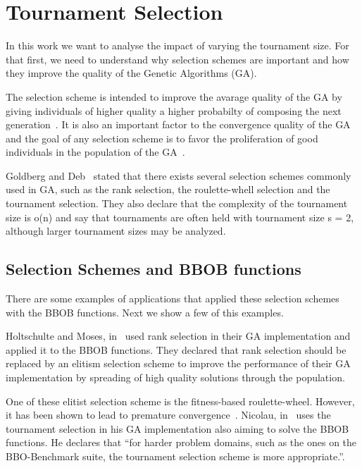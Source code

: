 \section{Tournament Selection}\label{sec:background:Selection Scheme} 

In this work we want to analyse the impact of varying the tournament size. For that first, we need to understand why selection schemes are important and how they improve the quality of the Genetic Algorithms (GA).

The selection scheme is intended to improve the avarage quality of the GA by giving individuals of higher quality a higher probabilty of composing the next generation~\cite{blickle1995mathematical}. It is also an important factor to the convergence quality of the GA and the goal of any selection scheme is to favor the proliferation of good individuals in the population of the GA~\cite{harik1999gambler}. 

Goldberg and Deb~\cite{goldberg1991comparative} stated that there exists several selection schemes commonly used in GA, such as the rank selection, the roulette-whell selection and the tournament selection. They also declare that the complexity of the tournament size is o(n) and say that tournaments are often held with tournament size s = 2, although larger tournament sizes may be analyzed.

\subsection{Selection Schemes and BBOB functions}

There are some examples of applications that applied these selection schemes with the BBOB functions. Next we show a few of this examples.

Holtschulte and Moses, in~\cite{holtschulte2013benchmarking} used rank selection in their GA implementation and applied it to the BBOB functions. They declared that rank selection should be replaced by an elitism selection scheme to improve the performance of their GA implementation by spreading of high quality solutions through the population. 

One of these elitist selection scheme is the fitness-based roulette-wheel. However, it has been shown to lead to premature convergence~\cite{baker1987reducing}. Nicolau, in~\cite{nicolau2009application} uses the tournament selection in his GA implementation also aiming to solve the BBOB functions. He declares that ``for harder problem domains, such as the ones on the BBO-Benchmark suite, the tournament selection scheme is more appropriate.''.

